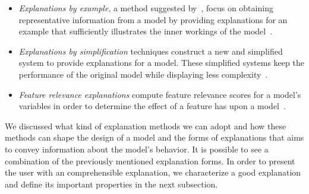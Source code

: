 \begin{itemize}
    \item \emph{Explanations by example}, a method suggested by~\cite{CaseBasedExplanation_Caruana}, focus on obtaining representative information from a model by providing explanations for an example that sufficiently illustrates the inner workings of the model~\parencite{HowToExplainIndividualClassificationDecisions_Baehrens, XAIConceptsTaxonomies_Arrieta}.
    \item \emph{Explanations by simplification} techniques construct a new and simplified system to provide explanations for a model. These simplified systems keep the performance of the original model while displaying less complexity~\parencite{XAIConceptsTaxonomies_Arrieta}.
    \item \emph{Feature relevance explanations} compute feature relevance scores for a model's variables in order to determine the effect of a feature has upon a model~\parencite{XAIConceptsTaxonomies_Arrieta}.
\end{itemize}
We discussed what kind of explanation methods we can adopt and how these methods can shape the design of a model and the forms of explanations that aims to convey information about the model's behavior. It is possible to see a combination of the previously mentioned explanation forms. In order to present the user with an comprehensible explanation, we characterize a good explanation and define its important properties in the next subsection.

